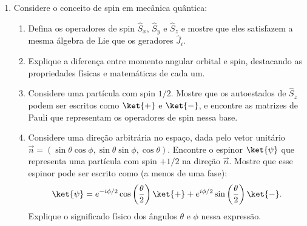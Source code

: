 \begin{enumerate}
	\item Considere o conceito de spin em mecânica quântica:
	      \begin{enumerate}
		      \item Defina os operadores de spin $\hat{S}_x$, $\hat{S}_y$ e
		            $\hat{S}_z$ e mostre que eles satisfazem a mesma álgebra de Lie
		            que os geradores $\hat{J}_i$.
		      \item Explique a diferença entre momento angular orbital e spin,
		            destacando as propriedades físicas e matemáticas de cada um.
		      \item Considere uma partícula com spin $1/2$. Mostre que os autoestados
		            de $\hat{S}_z$ podem ser escritos como $\ket{+}$ e
		            $\ket{-}$, e encontre as matrizes de Pauli que
		            representam os operadores de spin nessa base.
		      \item Considere uma direção arbitrária no espaço, dada pelo vetor unitário
		            $\vec{n} = (\sin\theta\cos\phi, \sin\theta\sin\phi, \cos\theta)$.
		            Encontre o espinor $\ket{\psi}$ que representa uma partícula com
		            spin $+1/2$ na direção $\vec{n}$. Mostre que esse espinor pode
		            ser escrito como (a menos de uma fase):
		            $$
			            \ket{\psi} = e^{-i\phi/2}\cos\left(\frac{\theta}{2}\right)\ket{+} + e^{i\phi/2}\sin\left(\frac{\theta}{2}\right)\ket{-}.
		            $$
		            Explique o significado físico dos ângulos $\theta$ e $\phi$
		            nessa expressão.
	      \end{enumerate}
\end{enumerate}


